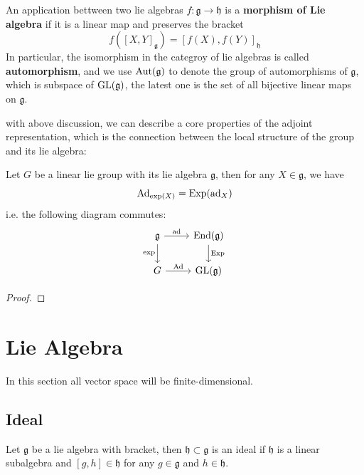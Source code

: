 \begin{remark}
    An application bettween two lie algebras \(f: \mathfrak{g} \to \mathfrak{h}\) is a \textbf{morphism of Lie algebra} if it is a linear map and preserves the bracket \[f([X,Y]_{\mathfrak{g}}) = [f(X), f(Y)]_{\mathfrak{h}}\]
    In particular, the isomorphism in the categroy of lie algebras is called \textbf{automorphism}, and we use \(\operatorname{Aut}(\mathfrak{g})\) to denote the group of automorphisms of \(\mathfrak{g}\), which is subspace of \(\operatorname{GL}(\mathfrak{g})\), the latest one is the set of all bijective linear maps on \(\mathfrak{g}\). 
\end{remark}

with above discussion, we can describe a core properties of the adjoint representation, which is the connection between the local structure of the group and its lie algebra:

\begin{colortheorem}
    Let \(G\) be a linear lie group with its lie algebra \(\mathfrak{g}\), then for any \(X \in \mathfrak{g}\), we have \[\operatorname{Ad}_{\exp(X)} = \operatorname{Exp}(\operatorname{ad}_X)\]
    i.e. the following diagram commutes:
    \[
\begin{tikzcd}
\mathfrak g \arrow[r, "\ad"] \arrow[d, "\exp"'] 
& \End(\mathfrak g) \arrow[d, "\Exp"] \\
G \arrow[r, "\Ad"] 
& \GL(\mathfrak g)
\end{tikzcd}
\]
\end{colortheorem}

\begin{proof}
    
\end{proof}







\newpage

\section{Lie Algebra}

In this section all vector space will be finite-dimensional.

\subsection{Ideal}

\begin{definition}
    Let \(\mathfrak{g}\) be a lie algebra with bracket, then \(\mathfrak{h} \subset \mathfrak{g}\) is an ideal if \(\mathfrak{h}\) is a linear subalgebra and \([g,h] \in \mathfrak{h}\) for any \(g \in \mathfrak{g}\) and \(h \in \mathfrak{h}\).
\end{definition}

